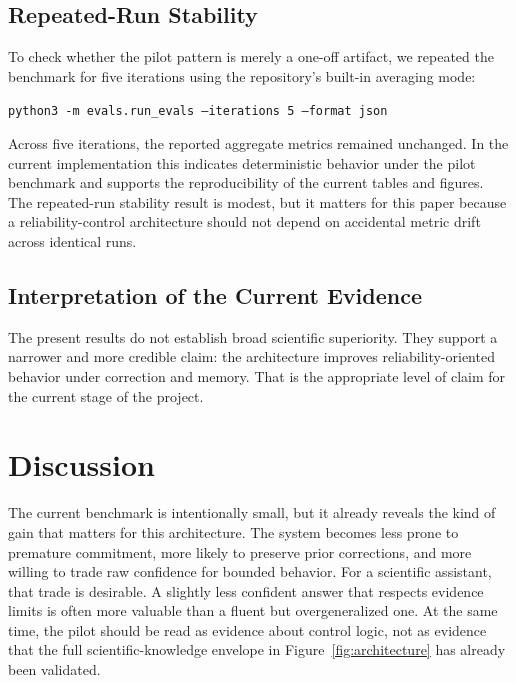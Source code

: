 \documentclass[12pt]{article}
\begin{document}
\subsection{Repeated-Run Stability}

To check whether the pilot pattern is merely a one-off artifact, we repeated the benchmark for five iterations using the repository's built-in averaging mode:

\begin{center}
\texttt{python3 -m evals.run\_evals --iterations 5 --format json}
\end{center}

Across five iterations, the reported aggregate metrics remained unchanged. In the current implementation this indicates deterministic behavior under the pilot benchmark and supports the reproducibility of the current tables and figures. The repeated-run stability result is modest, but it matters for this paper because a reliability-control architecture should not depend on accidental metric drift across identical runs.

\subsection{Interpretation of the Current Evidence}

The present results do not establish broad scientific superiority. They support a narrower and more credible claim: the architecture improves reliability-oriented behavior under correction and memory. That is the appropriate level of claim for the current stage of the project.

\section{Discussion}

The current benchmark is intentionally small, but it already reveals the kind of gain that matters for this architecture. The system becomes less prone to premature commitment, more likely to preserve prior corrections, and more willing to trade raw confidence for bounded behavior. For a scientific assistant, that trade is desirable. A slightly less confident answer that respects evidence limits is often more valuable than a fluent but overgeneralized one. At the same time, the pilot should be read as evidence about control logic, not as evidence that the full scientific-knowledge envelope in Figure~\ref{fig:architecture} has already been validated.
\end{document}
